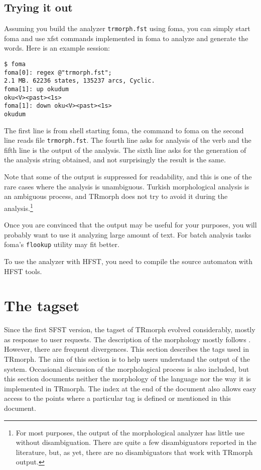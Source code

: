 \documentclass[twocolumn]{article}
\begin{document}
\subsection{Trying it out}

Assuming you build the analyzer \lstinline{trmorph.fst} using foma,
you can simply start foma and use xfst commands implemented in foma to
analyze and generate the words. Here is an example session:

\begin{lstlisting}[basicstyle={\color{blue!60!black!90}\small\tt}]
$ foma
foma[0]: regex @"trmorph.fst";
2.1 MB. 62236 states, 135237 arcs, Cyclic.
foma[1]: up okudum
oku<V><past><1s>
foma[1]: down oku<V><past><1s>
okudum
\end{lstlisting}%

The first line is from shell starting foma, the command to foma on the
second line reads file \lstinline{trmorph.fst}. The fourth line asks
for analysis of the verb  and the fifth
line is the output of the analysis. The sixth line asks for the
generation of the analysis string obtained, and not surprisingly the
result is the same.

Note that some of the output is suppressed for readability, and this
is one of the rare cases where the analysis is unambiguous. Turkish
morphological analysis is an ambiguous process, and TRmorph does not
try to avoid it during the analysis.\footnote{For most purposes, the
output of the morphological analyzer has little use without
disambiguation. There are quite a few disambiguators reported in the
literature, but, as yet, there are no disambiguators that work with
TRmorph output.}

Once you are convinced that the output may be useful for your
purposes, you will probably want to use it analyzing large amount of
text. For batch analysis tasks  foma's \lstinline{flookup} utility may
fit better.

To use the analyzer with HFST, you need to compile the source
automaton with HFST tools. 

\section{The tagset}

Since the first SFST version, the tagset of TRmorph evolved
considerably, mostly as response to user requests. The description of
the morphology mostly follows  \cite{goksel2005}. However, there are
frequent divergences. This section describes the tags used in TRmorph.
The aim of this section is to help users understand the output of the
system. Occasional discussion of the morphological process is also
included, but this section documents neither the morphology of the
language nor the way it is implemented in TRmorph. The index at the
end of the document also allows easy access to the points where a
particular tag is defined or mentioned in this document.
\end{document}
